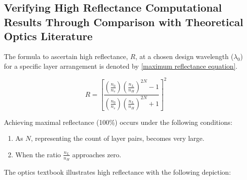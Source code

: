 
\subsection{Verifying High Reflectance Computational Results Through Comparison with Theoretical Optics Literature}
The formula to ascertain high reflectance, $R$, at a chosen design wavelength ($\lambda_0$) for a specific layer arrangement is denoted by \ref{maximum reflectance equation}.

\begin{equation}\label{formula for optimal reflectance - chap4}
    R = \left[ \frac{ \left( \frac{n_0}{n_s} \right) \left( \frac{n_L}{n_H} \right)^{2N}  - 1 }{  \left( \frac{n_0}{n_s} \right) \left( \frac{n_L}{n_H} \right)^{2N}  + 1}  \right]^2
\end{equation}

Achieving maximal reflectance (100\%) occurs under the following conditions:
\begin{enumerate}
    \item As $N$, representing the count of layer pairs, becomes very large.
    \item When the ratio $\frac{n_L}{n_H}$ approaches zero.
\end{enumerate}

The optics textbook illustrates high reflectance with the following depiction:

